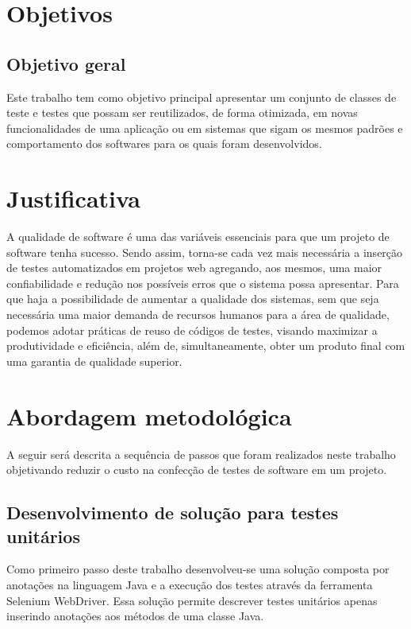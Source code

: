 \documentclass[tg]{mdtufsm}
\begin{document}
\section{Objetivos}

\subsection{Objetivo geral}

Este trabalho tem como objetivo principal apresentar um conjunto de classes de teste e testes que possam ser reutilizados, de forma otimizada, em novas funcionalidades de uma aplicação ou em sistemas que sigam os mesmos padrões e comportamento dos softwares para os quais foram desenvolvidos.

\section{Justificativa}

A qualidade de software  é uma das variáveis essenciais para que um projeto de software tenha sucesso.
Sendo assim, torna-se cada vez mais necessária a inserção de testes automatizados em projetos web agregando, aos mesmos, uma maior confiabilidade e redução nos possíveis
erros que o sistema possa apresentar. Para que haja a possibilidade de aumentar a qualidade dos sistemas, sem que seja necessária uma maior
demanda de recursos humanos para a área de qualidade, podemos adotar práticas de reuso de códigos de testes, visando
maximizar a produtividade e eficiência, além de, simultaneamente, obter um produto final com uma garantia de qualidade
superior.

\section{Abordagem metodológica}
A seguir será descrita a sequência de passos que foram realizados neste trabalho
objetivando reduzir o custo na confecção de testes de software em um projeto.

\subsection{Desenvolvimento de solução para testes unitários}
Como primeiro passo deste trabalho desenvolveu-se uma solução composta por anotações na linguagem Java e a execução dos testes através da ferramenta Selenium WebDriver.
Essa solução permite descrever testes unitários apenas inserindo anotações aos métodos de uma classe Java.
\end{document}
